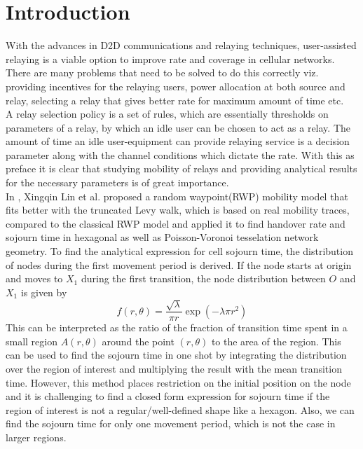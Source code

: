 \chapter{Introduction}
	With the advances in D2D communications and relaying techniques, user-assisted relaying is a viable option to improve rate and coverage in cellular networks. There are many problems that need to be solved to do this correctly viz. providing incentives for the relaying users, power allocation at both source and relay, selecting a relay that gives better rate for maximum amount of time etc. \\ 


	A relay selection policy is a set of rules, which are essentially thresholds on parameters of a relay, by which an idle user can be chosen to act as a relay. The amount of time an idle user-equipment can provide relaying service is a decision parameter along with the channel conditions which dictate the rate. With this as preface it is clear that studying mobility of relays and providing analytical results for the necessary parameters is of great importance. \\
	
	
	In \cite{lin}, Xingqin Lin et al. proposed a random waypoint(RWP) mobility model that fits better with the truncated Levy walk, which is based on real mobility traces, compared to the classical RWP model and applied it to find handover rate and sojourn time in hexagonal as well as Poisson-Voronoi tesselation network geometry. To find the analytical expression for cell sojourn time, the distribution of nodes during the first movement period is derived. If the node starts at origin and  moves to $X_1$ during the first transition, the node distribution between $O$ and $X_1$ is given by 
	\newpage
	\begin{equation} \label{eq:nodeDist}
		f(r,\theta) = \frac{\sqrt{\lambda}}{\pi r} \exp(-\lambda \pi r^2)
	\end{equation}
	This can be interpreted as the ratio of the fraction of transition time spent in a small region $A(r,\theta)$ around the point $(r,\theta)$ to the area of the region. This can be used to find the sojourn time in one shot by integrating the distribution over the region of interest and multiplying the result with the mean transition time. However, this method places restriction on the initial position on the node and it is challenging to find a closed form expression for sojourn time if the region of interest is not a regular/well-defined shape like a hexagon. Also, we can find the sojourn time for only one movement period, which is not the case in larger regions.     
	
